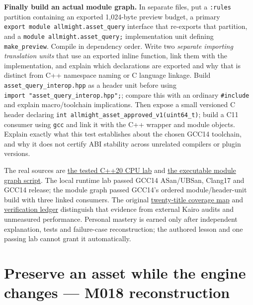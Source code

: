 \textbf{Finally build an actual module graph.} In separate files, put a \texttt{:rules} partition containing an exported 1,024-byte preview budget, a primary \texttt{export\ module\ allmight.asset\_query} interface that re-exports that partition, and a \texttt{module\ allmight.asset\_query;} implementation unit defining \texttt{make\_preview}. Compile in dependency order. Write two \emph{separate importing translation units} that use an exported inline function, link them with the implementation, and explain which declarations are exported and why that is distinct from C++ namespace naming or C language linkage. Build \texttt{asset\_query\_interop.hpp} as a header unit before using \texttt{import\ "asset\_query\_interop.hpp";}; compare this with an ordinary \texttt{\#include} and explain macro/toolchain implications. Then expose a small versioned C header declaring \texttt{int\ allmight\_asset\_approved\_v1(uint64\_t)}; build a C11 consumer using \texttt{gcc} and link it with the C++ wrapper and module objects. Explain exactly what this test establishes about the chosen GCC14 toolchain, and why it does not certify ABI stability across unrelated compilers or plugin versions.

The real sources are \href{tools/labs/asset_ranges_pmr_lab.cpp}{the tested C++20 CPU lab} and \href{tools/modules/build_module_lab.sh}{the executable module graph script}. The local runtime lab passed GCC14 ASan/UBSan, Clang17 and GCC14 release; the module graph passed GCC14's ordered module/header-unit build with three linked consumers. The original \hyperref[appendix-fd090d982a15-m017-parts-271290-lazy-asset-queries-allocation-lifetimes-and-compiled-api-boundaries]{twenty-title coverage map} and \hyperref[appendix-a103e7846d21-phase-7-additive-reconstruction-m017-parts-271290]{verification ledger} distinguish that evidence from external Kairo audits and unmeasured performance. Personal mastery is earned only after independent explanation, tests and failure-case reconstruction; the authored lesson and one passing lab cannot grant it automatically.

\section{Preserve an asset while the engine changes --- M018 reconstruction}\label{appendix-960160274237-preserve-an-asset-while-the-engine-changes-m018-reconstruction}

